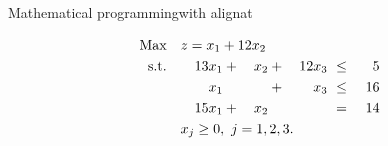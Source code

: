 \begin{frame}{Mathematical programming}{with alignat}





    \begin{scriptsize}

        \begin{alignat*}{5}  %
            \text{Max}  \quad \rlap{$z = x_1 + 12x_2$}                                   \\               
            \text{s.t.} \quad & & 13 x_1 & {}+{} &  x_2 & {}+{} & 12 x_3 & ~ \leq ~ & 5  \\
                              & &    x_1 &       &      & {}+{} &    x_3 & ~ \leq ~ & 16 \\
                              & & 15 x_1 & {}+{} &  x_2 &       &        & ~ =    ~ & 14 \\
                              & \rlap{$x_j \geq 0, ~ j=1,2,3.$}
        \end{alignat*}


\end{scriptsize}
\end{frame}
